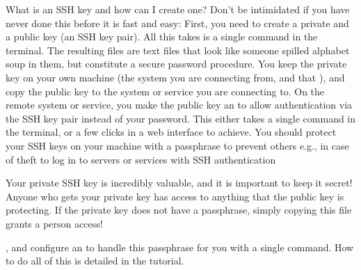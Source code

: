 \begin{findoutmore}[label={fom-sshkey}, before title={\thetcbcounter\ }, float, floatplacement=tb, check odd page=true]{What is an SSH key and how can I create one?}
\sphinxAtStartPar
Don’t be intimidated if you have never done this before \textendash{} it is fast and easy:
First, you need to create a private and a public key (an SSH key pair).
All this takes is a single command in the terminal. The resulting files are
text files that look like someone spilled alphabet soup in them, but constitute
a secure password procedure.
You keep the private key on your own machine (the system you are connecting from,
and that ),
and copy the public key to the system or service you are connecting to.
On the remote system or service, you make the public key an  to
allow authentication via the SSH key pair instead of your password. This
either takes a single command in the terminal, or a few clicks in a web interface
to achieve.
You should protect your SSH keys on your machine with a passphrase to prevent
others \textendash{} e.g., in case of theft \textendash{} to log in to servers or services with
SSH authentication%
\begin{footnote}\sphinxAtStartFootnote
Your private SSH key is incredibly valuable, and it is important to keep
it secret!
Anyone who gets your private key has access to anything that the public key
is protecting. If the private key does not have a passphrase, simply copying
this file grants a person access!
%
\end{footnote}, and configure an 
to handle this passphrase for you with a single command. How to do all of this
is detailed in the tutorial.


\end{findoutmore}



